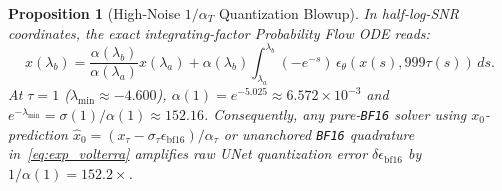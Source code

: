\documentclass[11pt,a4paper]{article}
\newtheorem{proposition}{Proposition}
\theoremstyle{definition}
\theoremstyle{remark}
\newcommand{\bfsixteen}{\texttt{BF16}}
\begin{document}
\begin{proposition}[High-Noise $1/\alpha_T$ Quantization Blowup]
\label{prop:blowup}
In half-log-SNR coordinates, the exact integrating-factor Probability Flow ODE reads:
\begin{equation}
\label{eq:exp_volterra}
    x(\lambda_b) = \frac{\alpha(\lambda_b)}{\alpha(\lambda_a)} x(\lambda_a) + \alpha(\lambda_b) \int_{\lambda_a}^{\lambda_b} (-e^{-s})\,\epsilon_\theta(x(s), 999\tau(s))\,ds.
\end{equation}
At $\tau = 1$ ($\lambda_{\min} \approx -4.600$), $\alpha(1) = e^{-5.025} \approx 6.572 \times 10^{-3}$ and $e^{-\lambda_{\min}} = \sigma(1)/\alpha(1) \approx 152.16$. Consequently, any pure-\bfsixteen{} solver using $x_0$-prediction $\hat{x}_0 = (x_\tau - \sigma_\tau \epsilon_{\mathrm{bf16}}) / \alpha_\tau$ or unanchored \bfsixteen{} quadrature in~\eqref{eq:exp_volterra} amplifies raw UNet quantization error $\delta\epsilon_{\mathrm{bf16}}$ by $1/\alpha(1) = 152.2\times$.
\end{proposition}
\end{document}
